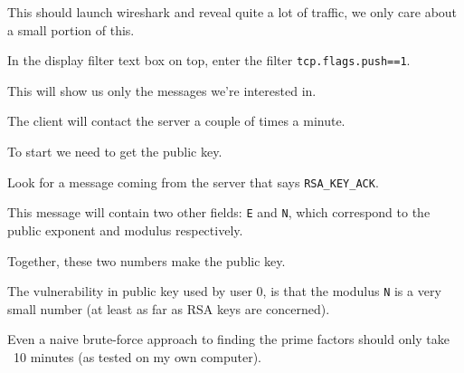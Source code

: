 {                            This should launch wireshark and reveal quite a lot of traffic, we only care about a small portion of this.







                            In the display filter text box on top, enter the filter \lstinline`tcp.flags.push==1`. 







                            This will show us only the messages we're interested in.







                            The client will contact the server a couple of times a minute.







                            To start we need to get the public key. 







                            Look for a message coming from the server that says \lstinline`RSA_KEY_ACK`. 







                            This message will contain two other fields: \lstinline`E` and \lstinline`N`, which correspond to the public exponent and modulus respectively.







                            Together, these two numbers make the public key.







                            The vulnerability in public key used by user 0, is that the modulus \lstinline`N` is a very small number (at least as far as RSA keys are concerned). 







                            Even a naive brute-force approach to finding the prime factors should only take ~10 minutes (as tested on my own computer). 







}
